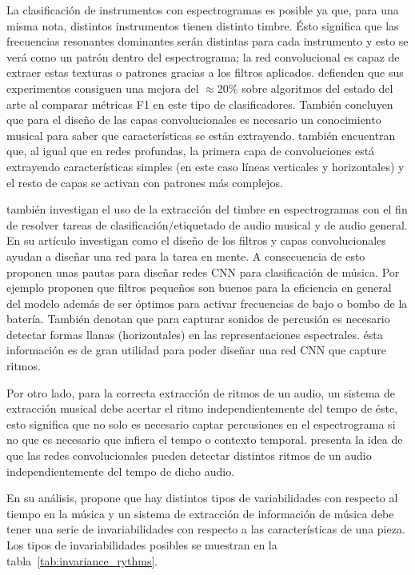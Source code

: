 La clasificación de instrumentos con espectrogramas es posible ya que, para una misma nota, distintos instrumentos tienen distinto timbre. Ésto significa que las frecuencias resonantes dominantes serán distintas para cada instrumento y esto se verá como un patrón dentro del espectrograma; la red convolucional es capaz de extraer estas texturas o patrones gracias a los filtros aplicados. \cite{Han:instrumentRecognition:2017} defienden que sus experimentos consiguen una mejora del $\approx20\%$ sobre algoritmos del estado del arte al comparar métricas F1 en este tipo de clasificadores. También concluyen que para el diseño de las capas convolucionales es necesario un conocimiento musical para saber que características se están extrayendo. \cite{Han:instrumentRecognition:2017} también encuentran que, al igual que en redes profundas, la primera capa de convoluciones está extrayendo características simples (en este caso líneas verticales y horizontales) y el resto de capas se activan con patrones más complejos.

\cite{DBLP:journals/corr/PonsSGGS17} también investigan el uso de la extracción del timbre en espectrogramas con el fin de resolver tareas de clasificación/etiquetado de audio musical y de audio general. En su artículo investigan como el diseño de los filtros y capas convolucionales ayudan a diseñar una red para la tarea en mente. A consecuencia de esto proponen unas pautas para diseñar redes CNN para clasificación de música. Por ejemplo proponen que filtros pequeños son buenos para la eficiencia en general del modelo además de ser óptimos para activar frecuencias de bajo o bombo de la batería. También denotan que para capturar sonidos de percusión es necesario detectar formas llanas (horizontales) en las representaciones espectrales. ésta información es de gran utilidad para poder diseñar una red CNN que capture ritmos.

Por otro lado, para la correcta extracción de ritmos de un audio, un sistema de extracción musical debe acertar el ritmo independientemente del tempo de éste, esto significa que no solo es necesario captar percusiones en el espectrograma si no que es necesario que infiera el tempo o contexto temporal. \cite{DBLP:journals/corr/abs-1804-08167} presenta la idea de que las redes convolucionales pueden detectar distintos ritmos de un audio independientemente del tempo de dicho audio.

En su análisis, \cite{DBLP:journals/corr/abs-1804-08167} propone que hay distintos tipos de variabilidades con respecto al tiempo en la música y un sistema de extracción de información de música debe tener una serie de invariabilidades con respecto a las características de una pieza. Los tipos de invariabilidades posibles se muestran en la tabla~\ref{tab:invariance_rythms}. 

